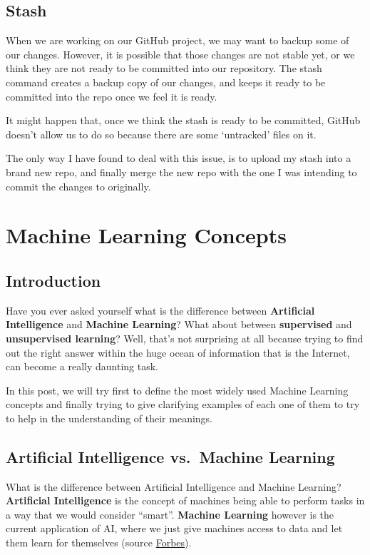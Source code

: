 \documentclass[]{book}
\begin{document}
\section{Stash}\label{stash}

When we are working on our GitHub project, we may want to backup some of
our changes. However, it is possible that those changes are not stable
yet, or we think they are not ready to be committed into our repository.
The stash command creates a backup copy of our changes, and keeps it
ready to be committed into the repo once we feel it is ready.

It might happen that, once we think the stash is ready to be committed,
GitHub doesn't allow us to do so because there are some `untracked'
files on it.

The only way I have found to deal with this issue, is to upload my stash
into a brand new repo, and finally merge the new repo with the one I was
intending to commit the changes to originally.

\chapter{Machine Learning Concepts}\label{machine-learning-concepts}

\section{Introduction}\label{introduction-1}

Have you ever asked yourself what is the difference between
\textbf{Artificial Intelligence} and \textbf{Machine Learning}? What
about between \textbf{supervised} and \textbf{unsupervised learning}?
Well, that's not surprising at all because trying to find out the right
answer within the huge ocean of information that is the Internet, can
become a really daunting task.

In this post, we will try first to define the most widely used Machine
Learning concepts and finally trying to give clarifying examples of each
one of them to try to help in the understanding of their meanings.

\section{Artificial Intelligence vs.~Machine
Learning}\label{artificial-intelligence-vs.machine-learning}

What is the difference between Artificial Intelligence and Machine
Learning? \textbf{Artificial Intelligence} is the concept of machines
being able to perform tasks in a way that we would consider ``smart''.
\textbf{Machine Learning} however is the current application of AI,
where we just give machines access to data and let them learn for
themselves (source
\href{https://www.forbes.com/sites/bernardmarr/2016/12/06/what-is-the-difference-between-artificial-intelligence-and-machine-learning/}{Forbes}).
\end{document}
